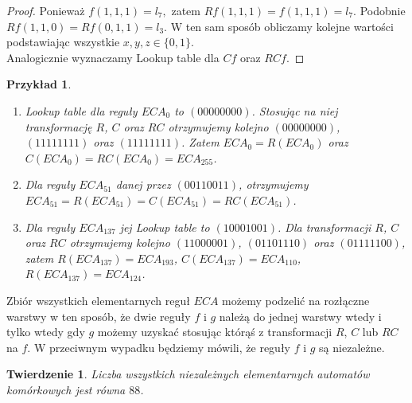 \documentclass{xmgr}
\newtheorem{theorem}{Twierdzenie}
\newtheorem{example}{Przykład}
\begin{document}
\begin{proof}
 Ponieważ $f(1,1,1) = l_{7},$ zatem $Rf(1,1,1) = f(1,1,1) = l_{7}$. Podobnie $Rf(1,1,0) = Rf(0,1,1) = l_{3}$. W ten sam sposób obliczamy 
 kolejne wartości podstawiając wszystkie $x,y,z \in \{0,1\}$.
 \\ Analogicznie wyznaczamy Lookup table dla $Cf$ oraz $RCf$.
\end{proof}

\begin{example}
 \begin{enumerate}
  \item Lookup table dla reguły $ECA_{0}$ to $(00000000)$. Stosując na niej transformację $R$, $C$ oraz $RC$ otrzymujemy kolejno $(00000000)$,
 $(11111111)$ oraz $(11111111)$. Zatem $ECA_{0} = R(ECA_{0})$ oraz \\$C(ECA_{0}) = RC(ECA_{0}) = ECA_{255}$.
 \item Dla reguły $ECA_{51}$ danej przez $(00110011)$, otrzymujemy $ECA_{51} = R(ECA_{51}) = C(ECA_{51}) = RC(ECA_{51})$.
 \item Dla reguły $ECA_{137}$ jej Lookup table to $(10001001)$. Dla transformacji $R$, $C$ oraz $RC$ otrzymujemy kolejno $(11000001)$, 
 $(01101110)$ oraz $(01111100)$, zatem $R(ECA_{137}) = ECA_{193}$, $C(ECA_{137}) = ECA_{110}$, $R(ECA_{137}) = ECA_{124}$.
 \end{enumerate}
\end{example}

Zbiór wszystkich elementarnych reguł $ECA$ możemy podzelić na rozłączne warstwy w ten sposób, że dwie reguły $f$ i $g$ należą do jednej warstwy wtedy
i tylko wtedy gdy $g$ możemy uzyskać stosując którąś z transformacji $R$, $C$ lub $RC$ na $f$. W przeciwnym wypadku będziemy mówili, że reguły
$f$ i $g$ są niezależne.

\begin{theorem}
 Liczba wszystkich niezależnych elementarnych automatów komórkowych jest równa $88$.
\end{theorem}
\end{document}

